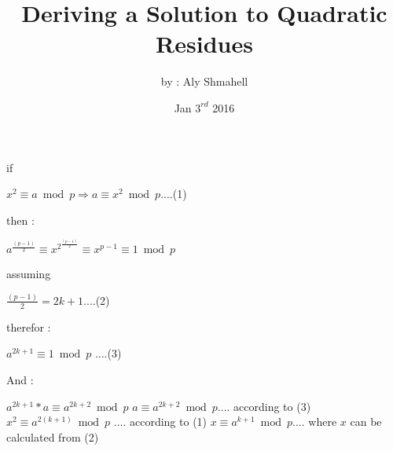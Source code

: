 \documentclass{article}
\title{Deriving a Solution to Quadratic Residues}
\author{by : Aly Shmahell}
\date{Jan $ 3^{rd} $ 2016}
\begin{document}
\maketitle
\begin{flushleft}
\begin{center}
if 
\end{center}
$ x^{2} \equiv a \bmod p \Rightarrow a \equiv x^{2} \bmod p $\space\space\space\space....(1) \newline
\begin{center}
then :
\end{center}
 $ a^{\frac{(p-1)}{2}} \equiv x^{2^{\frac{(p-1)}{2}}} \equiv x^{p-1} \equiv 1 \bmod p$ \newline
\begin{center}
assuming 
\end{center}
 $ \frac{(p-1)}{2} = 2k+1 $\space\space\space\space....(2) \newline
\begin{center}
therefor :
\end{center}
 $ a^{2k+1} \equiv 1 \bmod p $ \space\space\space\space....(3) \newline
\begin{center}
And :
\end{center}
$ a^{2k+1} * a \equiv a^{2k+2} \bmod p $ \newline\newline
$ a \equiv a^{2k+2} \bmod p $\space\space\space\space .... according to (3) \newline\newline
$ x^{2} \equiv a^{2(k+1)} \bmod p $ .... according to (1) \newline\newline
$ x \equiv a^{k+1} \bmod p $\space\space\space\space .... where $ x $ can be calculated from (2)
\end{flushleft}
\end{document}
